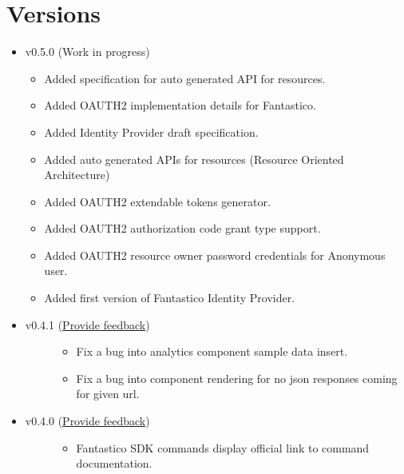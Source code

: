 \documentclass[letterpaper,10pt,english]{sphinxmanual}
\begin{document}
\section{Versions}
\label{changes:versions}\begin{itemize}
\item {} 
v0.5.0 (Work in progress)
\begin{itemize}
\item {} 
Added specification for auto generated API for resources.

\item {} 
Added OAUTH2 implementation details for Fantastico.

\item {} 
Added Identity Provider draft specification.

\item {} 
Added auto generated APIs for resources (Resource Oriented Architecture)

\item {} 
Added OAUTH2 extendable tokens generator.

\item {} 
Added OAUTH2 authorization code grant type support.

\item {} 
Added OAUTH2 resource owner password credentials for Anonymous user.

\item {} 
Added first version of Fantastico Identity Provider.

\end{itemize}

\item {} \begin{description}
\item[{v0.4.1 (\href{https://docs.google.com/forms/d/1tKBopU3lfDB\_w8F4h7Rl1Rn4uydAJq-nha09L\_ptJck/edit?usp=sharing}{Provide feedback})}] \leavevmode\begin{itemize}
\item {} 
Fix a bug into analytics component sample data insert.

\item {} 
Fix a bug into component rendering for no json responses coming for given url.

\end{itemize}

\end{description}

\item {} \begin{description}
\item[{v0.4.0 (\href{https://docs.google.com/forms/d/1tKBopU3lfDB\_w8F4h7Rl1Rn4uydAJq-nha09L\_ptJck/edit?usp=sharing}{Provide feedback})}] \leavevmode\begin{itemize}
\item {} 
Fantastico SDK commands display official link to command documentation.


\end{itemize}
\end{description}
\end{itemize}
\end{document}
